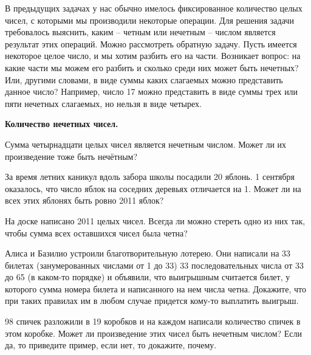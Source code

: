 В предыдущих задачах у нас обычно имелось фиксированное количество целых чисел, с которыми мы производили некоторые операции. Для решения задачи требовалось выяснить, каким – четным или нечетным – числом является результат этих операций. Можно рассмотреть обратную задачу. Пусть имеется некоторое целое число, и мы хотим разбить его на части. Возникает вопрос: на какие части мы можем его разбить и сколько среди них может быть нечетных? Или, другими словами, в виде суммы каких слагаемых можно представить данное число? Например, число 17 можно представить в виде суммы трех или пяти нечетных слагаемых, но нельзя в виде четырех.

\begin{center}
	\large\textbf{Количество нечетных чисел.}
\end{center}

\begin{thm}
	Сумма четырнадцати целых чисел является нечетным числом. Может ли их произведение тоже быть нечётным?
\end{thm}


\begin{thm}
	За время летних каникул вдоль забора школы посадили 20 яблонь. 1 сентября оказалось, что число яблок на соседних деревьях отличается на 1. Может ли на всех этих яблонях быть ровно 2011 яблок?
\end{thm}

\begin{thm}\label{1.7}
	На доске написано 2011 целых чисел. Всегда ли можно стереть одно из них так, чтобы сумма всех оставшихся чисел была четна?
\end{thm}
\begin{thm}\label{1.8}	Алиса и Базилио устроили благотворительную лотерею. Они написали на 33 билетах (занумерованных числами от 1 до 33) 33 последовательных числа от 33 до 65 (в каком-то порядке) и объявили, что выигрышным считается билет, у которого сумма номера билета и написанного на нем числа четна. Докажите, что при таких правилах им в любом случае придется кому-то выплатить выигрыш.
\end{thm}
\begin{thm}\label{an4.1}	98 спичек разложили в 19 коробков и на каждом написали количество спичек в этом коробке. Может ли произведение этих чисел быть нечетным числом? Если да, то приведите пример, если нет, то докажите, почему.
\end{thm}

